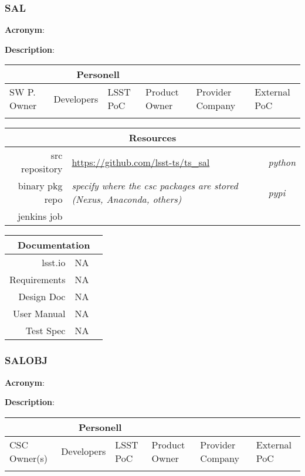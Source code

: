 
\subsubsection{SAL}

\textbf{Acronym}: 

\textbf{Description}:

\begin{longtable}[]{p{2cm}p{2cm}p{2cm}p{2cm}p{2cm}p{2cm}}
\hline
\multicolumn{4}{c}{\textbf{Personell}} \\ \hline
SW P. Owner & Developers & LSST PoC   & Product Owner & Provider Company & External PoC \\ \hline
            &            &            &               &                  &              \\ \hline
\end{longtable}

\begin{longtable}[]{rll}
\hline
\multicolumn{3}{c}{\textbf{Resources}} \\ \hline
src repository    & \url{https://github.com/lsst-ts/ts_sal} & \textit{python} \\ \hline
binary pkg repo   & \textit{specify where the csc packages are stored (Nexus, Anaconda, others)} & \textit{pypi}\\ \hline
\hline
jenkins job    & & \\ \hline
\end{longtable}

\begin{longtable}[]{rll}
\hline
\multicolumn{3}{c}{\textbf{Documentation}} \\ \hline
lsst.io & NA & \\ \hline
Requirements & NA & \\ \hline
Design Doc & NA & \\ \hline
User Manual & NA & \\ \hline
Test Spec & NA & \\ \hline
\end{longtable}


\subsubsection{SALOBJ}

\textbf{Acronym}: 

\textbf{Description}:

\begin{longtable}[]{p{2cm}p{2cm}p{2cm}p{2cm}p{2cm}p{2cm}}
\hline
\multicolumn{4}{c}{\textbf{Personell}} \\ \hline
CSC Owner(s) & Developers & LSST PoC   & Product Owner & Provider Company & External PoC \\ \hline
             &            &            &               &                  &              \\ \hline
\end{longtable}

